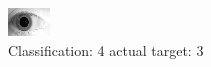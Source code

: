 \begin{figure}[h!]
\begin{center}
\includegraphics[width=0.60\columnwidth]{figures/ID1979_class_4_target_3.png}
\end{center}
\caption{ Classification: 4 actual target: 3}
\label{fig:ID1979_class_4_target_3}
\end{figure}
